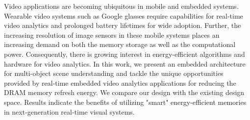 Video applications are becoming ubiquitous in mobile and embedded systems. Wearable video systems such as Google glasses require capabilities for real-time video analytics and prolonged battery lifetimes for wide adoption. Further, the increasing resolution of image sensors in these mobile systems places an increasing demand on both the memory storage as well as the computational power. Consequently, there is growing interest in energy-efficient algorithms and hardware for video analytics. In this work, we present an embedded architecture for multi-object scene understanding and tackle the unique opportunities provided by real-time embedded video analytics applications for reducing the DRAM memory refresh energy. We compare our design with the existing design space. Results indicate the benefits of utilizing "smart" energy-efficient memories in next-generation real-time visual systems. 
